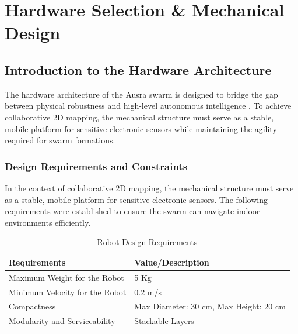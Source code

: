 
\chapter{Hardware Selection \& Mechanical Design}
\label{chap:mechanical}

\section{Introduction to the Hardware Architecture}
\label{sec:hardware_intro}

The hardware architecture of the Ausra swarm is designed to bridge the gap between physical robustness and high-level autonomous intelligence \cite{siegwart2011introduction}. To achieve collaborative 2D mapping, the mechanical structure must serve as a stable, mobile platform for sensitive electronic sensors while maintaining the agility required for swarm formations.

\subsection{Design Requirements and Constraints}
In the context of collaborative 2D mapping, the mechanical structure must serve as a stable, mobile platform for sensitive electronic sensors. The following requirements were established to ensure the swarm can navigate indoor environments efficiently.

\begin{table}[H]
    \centering
    \caption{Robot Design Requirements}
    \label{tab:design_reqs}
    \begin{tabular}{|l|l|}
    \hline
    \textbf{Requirements} & \textbf{Value/Description} \\
    \hline
    Maximum Weight for the Robot & 5 Kg \\
    \hline
    Minimum Velocity for the Robot & 0.2 m/s \\
    \hline
    Compactness & Max Diameter: 30 cm, Max Height: 20 cm \\
    \hline
    Modularity and Serviceability & Stackable Layers \\
    \hline
    \end{tabular}
\end{table}

